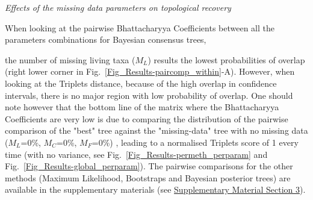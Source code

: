 \documentclass[12pt,letterpaper]{article}
\renewcommand{\subsection}[1]{%
\bigskip
\begin{center}
\begin{large}
\normalfont\itshape #1
\end{large}
\end{center}}
\begin{document}
\subsection{Effects of the missing data parameters on topological recovery}

\label{Fig_Results-paircomp_within}



When looking at the pairwise Bhattacharyya Coefficients between all the parameters combinations for Bayesian consensus trees, %

the number of missing living taxa ($M_{L}$) results the lowest probabilities of overlap (right lower corner in Fig.~\ref{Fig_Results-paircomp_within}-A). However, when looking at the Triplets distance, because of the high overlap in confidence intervals, there is no major region with low probability of overlap. One should note however that the bottom line of the matrix where the Bhattacharyya Coefficients are very low is due to comparing the distribution of the pairwise comparison of the "best" tree against the "missing-data" tree with no missing data ($M_{L}$=0\%, $M_{C}$=0\%, $M_{F}$=0\%) , leading to a normalised Triplets score of 1 every time (with no variance, see Fig.~\ref{Fig_Results-permeth_perparam} and Fig.~\ref{Fig_Results-global_perparam}). The pairwise comparisons for the other methods (Maximum Likelihood, Bootstraps and Bayesian posterior trees) are available in the supplementary materials (see \hyperref[SupplementaryMaterial]{Supplementary Material Section 3}).
\end{document}
